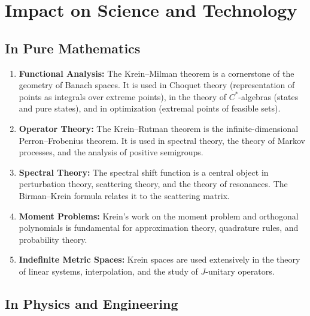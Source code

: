 \section{Impact on Science and Technology}

\subsection{In Pure Mathematics}

\begin{enumerate}
    \item \textbf{Functional Analysis:} The Krein--Milman theorem is a cornerstone of the geometry of Banach spaces. It is used in Choquet theory (representation of points as integrals over extreme points), in the theory of $C^*$-algebras (states and pure states), and in optimization (extremal points of feasible sets).
    
    \item \textbf{Operator Theory:} The Krein--Rutman theorem is the infinite-dimensional Perron--Frobenius theorem. It is used in spectral theory, the theory of Markov processes, and the analysis of positive semigroups.
    
    \item \textbf{Spectral Theory:} The spectral shift function is a central object in perturbation theory, scattering theory, and the theory of resonances. The Birman--Krein formula relates it to the scattering matrix.
    
    \item \textbf{Moment Problems:} Krein's work on the moment problem and orthogonal polynomials is fundamental for approximation theory, quadrature rules, and probability theory.
    
    \item \textbf{Indefinite Metric Spaces:} Krein spaces are used extensively in the theory of linear systems, interpolation, and the study of $J$-unitary operators.
\end{enumerate}

\subsection{In Physics and Engineering}


